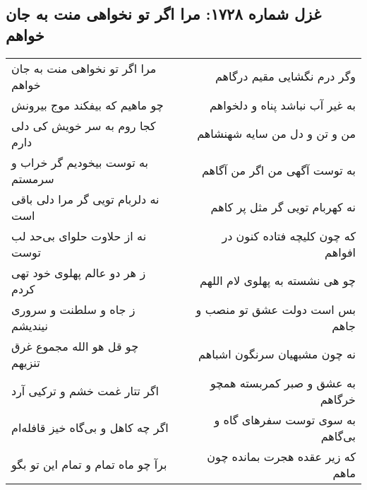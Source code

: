 \begin{center}
\section*{غزل شماره ۱۷۲۸: مرا اگر تو نخواهی منت به جان خواهم}
\label{sec:1728}
\begin{longtable}{l p{0.5cm} r}
مرا اگر تو نخواهی منت به جان خواهم
&&
وگر درم نگشایی مقیم درگاهم
\\
چو ماهیم که بیفکند موج بیرونش
&&
به غیر آب نباشد پناه و دلخواهم
\\
کجا روم به سر خویش کی دلی دارم
&&
من و تن و دل من سایه شهنشاهم
\\
به توست بیخودیم گر خراب و سرمستم
&&
به توست آگهی من اگر من آگاهم
\\
نه دلربام تویی گر مرا دلی باقی است
&&
نه کهربام تویی گر مثل پر کاهم
\\
نه از حلاوت حلوای بی‌حد لب توست
&&
که چون کلیچه فتاده کنون در افواهم
\\
ز هر دو عالم پهلوی خود تهی کردم
&&
چو هی نشسته به پهلوی لام اللهم
\\
ز جاه و سلطنت و سروری نیندیشم
&&
بس است دولت عشق تو منصب و جاهم
\\
چو قل هو الله مجموع غرق تنزیهم
&&
نه چون مشبهیان سرنگون اشباهم
\\
اگر تتار غمت خشم و ترکیی آرد
&&
به عشق و صبر کمربسته همچو خرگاهم
\\
اگر چه کاهل و بی‌گاه خیز قافله‌ام
&&
به سوی توست سفرهای گاه و بی‌گاهم
\\
برآ چو ماه تمام و تمام این تو بگو
&&
که زیر عقده هجرت بمانده چون ماهم
\\
\end{longtable}
\end{center}
